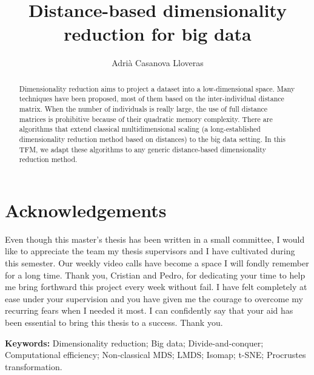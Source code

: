 \documentclass[a4paper,12pt]{article}
\title{Distance-based dimensionality reduction for big data}
\author{Adrià Casanova Lloveras}
\begin{document}


\section*{Acknowledgements}

Even though this master's thesis has been written in a small committee, I would like to appreciate the team my thesis supervisors and I have cultivated during this semester. Our weekly video calls have become a space I will fondly remember for a long time. Thank you, Cristian and Pedro, for dedicating your time to help me bring forthward this project every week without fail. I have felt completely at ease under your supervision and you have given me the courage to overcome my recurring fears when I needed it most. I can confidently say that your aid has been essential to bring this thesis to a success. Thank you.

\pagebreak
\begin{abstract}
    Dimensionality reduction aims to project a dataset into a low-dimensional space. Many techniques have been proposed, most of them based on the inter-individual distance matrix. When the number of individuals is really large, the use of full distance matrices is prohibitive because of their quadratic memory complexity. There are algorithms that extend classical multidimensional scaling (a long-established dimensionality reduction method based on distances) to the big data setting. In this TFM, we adapt these algorithms to any generic distance-based dimensionality reduction method.
\end{abstract}

\noindent\textbf{Keywords:} Dimensionality reduction; Big data; Divide-and-conquer; Computational efficiency; Non-classical MDS; LMDS; Isomap; t-SNE; Procrustes transformation.
\pagebreak

\tableofcontents
\pagebreak


\pagebreak


\pagebreak


\pagebreak


\pagebreak


\pagebreak


\pagebreak


\pagebreak

\printbibliography
\pagebreak
\end{document}
